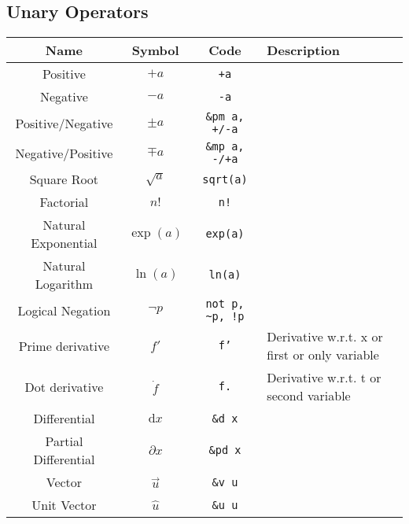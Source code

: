 \documentclass{article}
\begin{document}
  \newpage

  \subsection{Unary Operators} %
  \label{sub:unary_ops}
  \begin{table}[!h]
    \centering
    \begin{tabular}{|c|c|c|l|}
      \hline
      \textbf{Name} & \textbf{Symbol} & \textbf{Code} & \textbf{Description} \\
      \hline\hline

      Positive & \( +a \) & \texttt{+a} & \\
      Negative & \( -a \) & \texttt{-a} & \\
      Positive/Negative & \( \pm a \) & \texttt{\&pm a, +/-a} & \\
      Negative/Positive & \( \mp a \) & \texttt{\&mp a, -/+a} & \\
      Square Root & \( \sqrt{a} \) & \texttt{sqrt(a)} & \\
      Factorial & \( n! \) & \texttt{n!} & \\
      Natural Exponential & \( \exp(a) \) & \texttt{exp(a)} & \\
      Natural Logarithm & \( \ln(a) \) & \texttt{ln(a)} & \\
      Logical Negation & \( \neg p \) & \texttt{not p, \~{}p, !p} & \\
      \hline
      Prime derivative & \( f' \) & \texttt{f'} & Derivative w.r.t. x or first or only variable\\
      Dot derivative & \( \dot{f} \) & \texttt{f.} & Derivative w.r.t. t or second variable\\
      Differential & \( \mathrm{d}x \) & \texttt{\&d x} & \\
      Partial Differential & \( \partial x \) & \texttt{\&pd x} & \\
      Vector & \( \vec{u} \) & \texttt{\&v u} & \\
      Unit Vector & \( \hat{u} \) & \texttt{\&u u} & \\
      \hline
    \end{tabular}
  \end{table}
\end{document}
